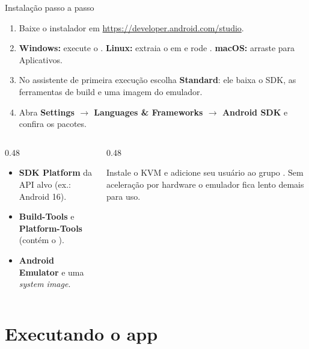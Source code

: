 \documentclass[aspectratio=169,10pt]{beamer}
\begin{document}
\begin{frame}{Instalação passo a passo}
  \begin{enumerate}
    \item Baixe o instalador em \url{https://developer.android.com/studio}.
    \item \textbf{Windows:} execute o . \textbf{Linux:} extraia o  em  e rode . \textbf{macOS:} arraste para Aplicativos.
    \item No assistente de primeira execução escolha \textbf{Standard}: ele baixa o SDK, as ferramentas de build e uma imagem do emulador.
    \item Abra \textbf{Settings $\rightarrow$ Languages \& Frameworks $\rightarrow$ Android SDK} e confira os pacotes.
  \end{enumerate}
  \vspace{2pt}
  \begin{columns}[T]
    \begin{column}{0.48\textwidth}
      \begin{conceito}
        \begin{itemize}
          \item \textbf{SDK Platform} da API alvo (ex.: Android 16).
          \item \textbf{Build-Tools} e \textbf{Platform-Tools} (contém o ).
          \item \textbf{Android Emulator} e uma \emph{system image}.
        \end{itemize}
      \end{conceito}
    \end{column}
    \begin{column}{0.48\textwidth}
      \begin{dica}
        Instale o KVM e adicione seu usuário ao grupo . Sem aceleração por hardware o emulador fica lento demais para uso.
      \end{dica}
    \end{column}
  \end{columns}
\end{frame}

\section{Executando o app}
\end{document}
